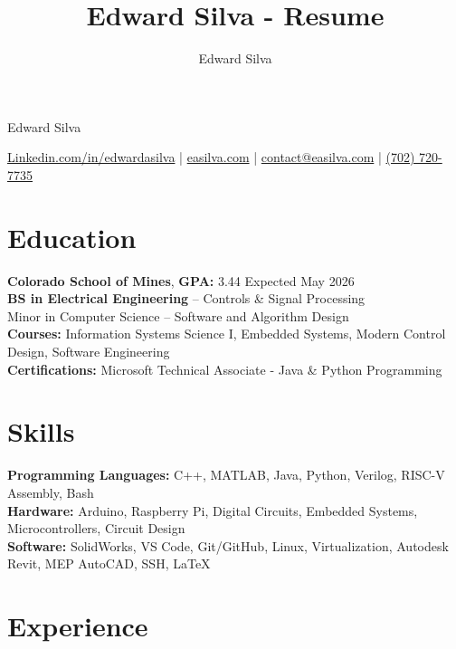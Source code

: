 \documentclass[11pt]{article}
\title{Edward Silva - Resume}
\author{Edward Silva}
\begin{document}
\thispagestyle{empty}

\centerline{\huge Edward Silva}
\vspace{3pt}

\centerline{
\href{https://www.linkedin.com/in/edwardasilva/}{Linkedin.com/in/edwardasilva}
| \href{https://easilva.com}{easilva.com}
| \href{mailto:contact@easilva.com}{contact@easilva.com} 
| \href{tel:702 720-7735}{(702) 720-7735}
}

\vspace{-10pt}
\section*{Education}
\vspace{1pt}

\textbf{Colorado School of Mines}, \textbf{GPA:} 3.44  \hfill Expected May 2026\\
\textbf{BS in Electrical Engineering} -- Controls \& Signal Processing  \\
Minor in Computer Science -- Software and Algorithm Design\\
\textbf{Courses:} Information Systems Science I, Embedded Systems, Modern Control Design, Software Engineering\\
\textbf{Certifications:} Microsoft Technical Associate - Java \& Python Programming

\vspace{-10pt}
\section*{Skills}
\vspace{-1pt}

\textbf{Programming Languages:} C++, MATLAB, Java, Python, Verilog, RISC-V Assembly, Bash \\
\textbf{Hardware:} Arduino, Raspberry Pi, Digital Circuits, Embedded Systems, Microcontrollers, Circuit Design \\
\textbf{Software:} SolidWorks, VS Code, Git/GitHub, Linux, Virtualization, Autodesk Revit, MEP AutoCAD, SSH, LaTeX \\

\vspace{-14pt}
\section*{Experience}
\vspace{5pt}
\end{document}
